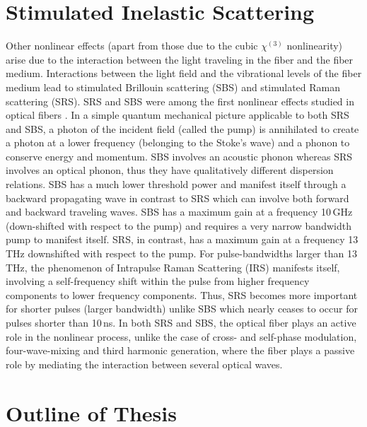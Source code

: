 \section{Stimulated Inelastic Scattering}

Other nonlinear effects (apart from those due to the cubic $\chi^{(3)}$
nonlinearity) arise due to the interaction between the light
traveling in the fiber and the fiber medium. Interactions between
the light field and the vibrational levels of the fiber medium lead to
stimulated Brillouin scattering (SBS) and stimulated Raman
scattering (SRS). SRS and SBS were among the first nonlinear effects
studied in optical fibers \cite{Stolen,Ippen,Smith}.  In a simple quantum
mechanical picture \cite{Agrawal1} applicable to
both SRS and SBS, a photon of the incident field (called the pump) is
annihilated to create a photon at a lower frequency (belonging to the
Stoke's wave) and a phonon to conserve energy and momentum. SBS involves
an acoustic phonon whereas SRS involves an optical phonon, thus they have
qualitatively different dispersion relations. SBS has a much
lower threshold power and manifest itself through a backward propagating
wave in contrast to SRS which can involve both forward and backward
traveling waves. SBS has a maximum gain at a frequency 10\,GHz \cite{Agrawal9}
(down-shifted with respect to the pump) and
requires a very narrow bandwidth pump to manifest itself. SRS, in
contrast, has a maximum gain at a frequency 13\,THz \cite{Agrawal8} downshifted with
respect to the pump. For pulse-bandwidths larger than 13\,THz, the
phenomenon of Intrapulse Raman Scattering (IRS) manifests itself,
involving a self-frequency shift within the pulse from higher frequency
components to lower frequency components. Thus, SRS
becomes more important for shorter pulses (larger bandwidth) unlike SBS
which nearly ceases to occur for pulses shorter than 10\,ns. In both SRS
and SBS, the optical fiber plays an active role in the nonlinear process,
unlike the case of cross- and self-phase modulation, four-wave-mixing and
third harmonic generation, where the fiber plays a passive role by
mediating the interaction between several optical waves.

\section{Outline of Thesis}

